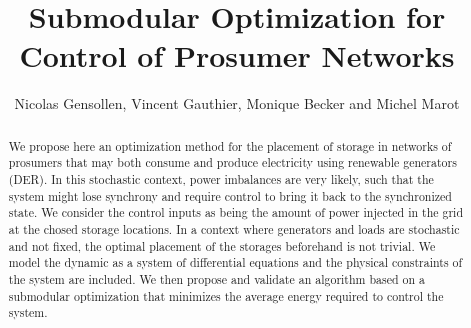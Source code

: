 \documentclass[conference]{IEEEtran}
\begin{document}
\pagestyle{plain}
\title{Submodular Optimization for Control of Prosumer Networks}


\author{Nicolas Gensollen, Vincent Gauthier, Monique Becker and Michel Marot  \\
}


\maketitle


\begin{abstract}

We propose here an optimization method for the placement of storage in networks of prosumers that may both consume and produce electricity using renewable generators (DER). In this stochastic context, power imbalances are very likely, such that the system might lose synchrony and require control to bring it back to the synchronized state. We consider the control inputs as being the amount of power injected in the grid at the chosed storage locations. In a context where generators and loads are stochastic and not fixed, the optimal placement of the storages beforehand is not trivial. We model the dynamic as a system of differential equations and the physical constraints of the system are included. We then propose and validate an algorithm based on a submodular optimization that minimizes the average energy required to control the system.

\end{abstract}
\end{document}
